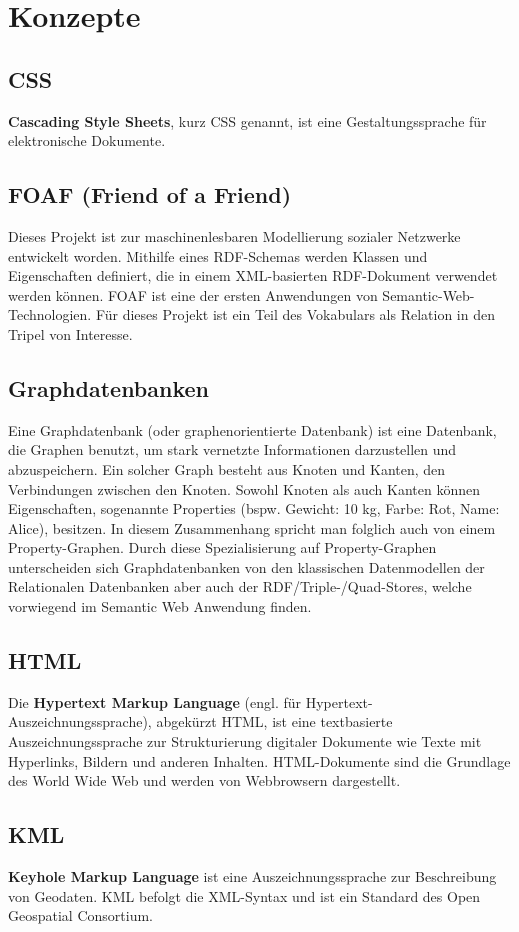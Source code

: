 \documentclass[11pt,a4paper]{article}
\begin{document}
\section{Konzepte}
\subsection{CSS}
\textbf{Cascading Style Sheets}, kurz CSS genannt, ist eine Gestaltungssprache für elektronische Dokumente.
\subsection{FOAF (Friend of a Friend)}
Dieses  Projekt ist zur maschinenlesbaren Modellierung sozialer Netzwerke  entwickelt worden. Mithilfe eines RDF-Schemas werden Klassen und  Eigenschaften definiert, die in einem XML-basierten RDF-Dokument  verwendet werden können. FOAF ist eine der ersten Anwendungen von  Semantic-Web-Technologien.
Für dieses Projekt ist ein Teil des Vokabulars als Relation in den Tripel von Interesse.
\subsection{Graphdatenbanken}
Eine Graphdatenbank (oder graphenorientierte Datenbank) ist eine Datenbank, die Graphen benutzt, um stark vernetzte Informationen darzustellen und abzuspeichern. Ein solcher Graph besteht aus Knoten und Kanten, den Verbindungen zwischen den Knoten. Sowohl Knoten als auch Kanten können Eigenschaften, sogenannte Properties (bspw. Gewicht: 10 kg, Farbe: Rot, Name: Alice), besitzen. In diesem Zusammenhang spricht man folglich auch von einem Property-Graphen. Durch diese Spezialisierung auf Property-Graphen unterscheiden sich Graphdatenbanken von den klassischen Datenmodellen der Relationalen Datenbanken aber auch der RDF/Triple-/Quad-Stores, welche vorwiegend im Semantic Web Anwendung finden.
\subsection{HTML}
Die \textbf{Hypertext Markup Language} (engl. für Hypertext-Auszeichnungssprache), abgekürzt HTML, ist eine textbasierte Auszeichnungssprache zur Strukturierung digitaler Dokumente wie Texte mit Hyperlinks, Bildern und anderen Inhalten. HTML-Dokumente sind die Grundlage des World Wide Web und werden von Webbrowsern dargestellt.
\subsection{KML}
\textbf{Keyhole Markup Language} ist eine Auszeichnungssprache zur Beschreibung von Geodaten. KML befolgt die XML-Syntax und ist ein Standard des Open Geospatial Consortium.
\end{document}
